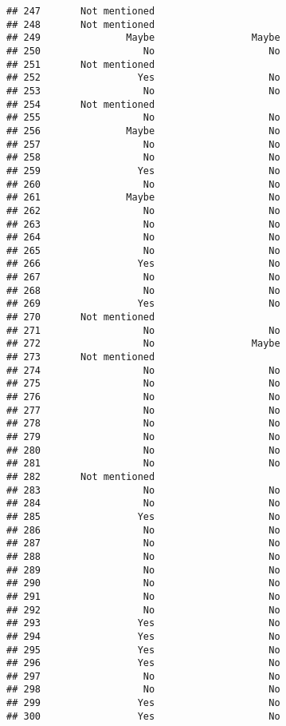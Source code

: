 \documentclass[
]{article}
\begin{document}
\begin{verbatim}
## 247       Not mentioned                      
## 248       Not mentioned                      
## 249               Maybe                 Maybe
## 250                  No                    No
## 251       Not mentioned                      
## 252                 Yes                    No
## 253                  No                    No
## 254       Not mentioned                      
## 255                  No                    No
## 256               Maybe                    No
## 257                  No                    No
## 258                  No                    No
## 259                 Yes                    No
## 260                  No                    No
## 261               Maybe                    No
## 262                  No                    No
## 263                  No                    No
## 264                  No                    No
## 265                  No                    No
## 266                 Yes                    No
## 267                  No                    No
## 268                  No                    No
## 269                 Yes                    No
## 270       Not mentioned                      
## 271                  No                    No
## 272                  No                 Maybe
## 273       Not mentioned                      
## 274                  No                    No
## 275                  No                    No
## 276                  No                    No
## 277                  No                    No
## 278                  No                    No
## 279                  No                    No
## 280                  No                    No
## 281                  No                    No
## 282       Not mentioned                      
## 283                  No                    No
## 284                  No                    No
## 285                 Yes                    No
## 286                  No                    No
## 287                  No                    No
## 288                  No                    No
## 289                  No                    No
## 290                  No                    No
## 291                  No                    No
## 292                  No                    No
## 293                 Yes                    No
## 294                 Yes                    No
## 295                 Yes                    No
## 296                 Yes                    No
## 297                  No                    No
## 298                  No                    No
## 299                 Yes                    No
## 300                 Yes                    No

\end{verbatim}
\end{document}
